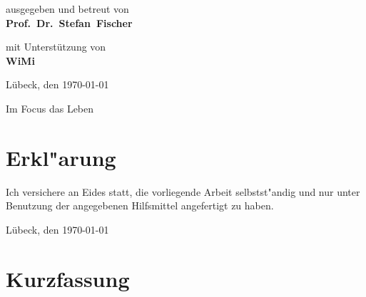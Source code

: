 \documentclass[
	ngerman,
	11pt,
	twoside,
	a4paper,
	headsepline,
	footsepline, 
	toc=bib
]{scrbook}
\begin{document}
\begin{titlepage}
{	\titlepageskip
	ausgegeben und betreut von\\
	\textbf{Prof.~Dr.~Stefan~Fischer}

	\titlepageskip
	{
		mit Unterstützung von\\
		\textbf{WiMi}\\
	}


	\vfill
	{
		Lübeck, den \today
	}

	{
		\titlepageskip
		Im Focus das Leben
	}
}
\end{titlepage}
\restoregeometry

\cleardoublepage

\newpage
\chapter*{Erkl"arung}

Ich versichere an Eides statt, die vorliegende Arbeit selbstst"andig und nur unter Benutzung
der angegebenen Hilfsmittel angefertigt zu haben.

\vspace*{3cm}
Lübeck, den \today

\thispagestyle{empty}
\cleardoublepage



\chapter*{Kurzfassung}
\end{document}
